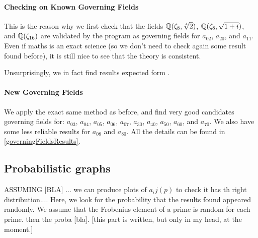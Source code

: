 \paragraph{Checking on Known Governing Fields}
This is the reason why we first check that the fields $\mathbb{Q}(\zeta_8, \sqrt[4]{2})$, $\mathbb{Q}(\zeta_8, \sqrt{1+i})$, and $\mathbb{Q}(\zeta_{16})$ are validated by the program as governing fields for $a_{02}$, $a_{20}$, and $a_{11}$.
Even if maths is an exact science (so we don't need to check again some result found before), it is still nice to see that the theory is consistent.

Unsurprisingly, we in fact find results expected form \cite[§7]{StructureAlgebreHecke}.

\paragraph{New Governing Fields}
We apply the exact same method as before, and find very good candidates governing fields for: $a_{03}$, $a_{04}$, $a_{05}$, $a_{06}$, $a_{07}$, $a_{30}$, $a_{40}$, $a_{50}$, $a_{60}$, and $a_{70}$.
We also have some less reliable results for $a_{08}$ and $a_{80}$.
All the details can be found in \ref{governingFieldsResults}.



\subsection{Probabilistic graphs}
ASSUMING [BLA]
... we can produce plots of $a_ij(p)$ to check it has th right distribution....
Here, we look for the probability that the results found appeared randomly.
We assume that the Frobenius element of a prime is random for each prime.
then the proba [bla].
[this part is written, but only in my head, at the moment.]



